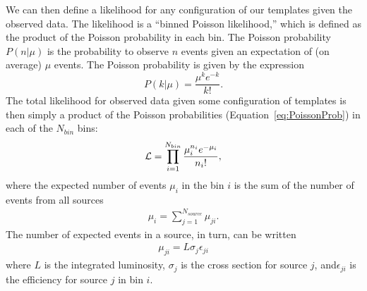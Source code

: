 We can then define a likelihood for any configuration of our templates given the
observed data.  The likelihood is a ``binned Poisson likelihood,'' which is
defined as the product of the Poisson probability in each bin.  The Poisson
probability $P(n|\mu)$ is the probability to observe $n$ events given an
expectation of (on average) $\mu$ events.  The Poisson probability is given by
the expression 
\begin{equation}
  P(k|\mu) = \frac{\mu^k e^{-k}}{k!}.
  \label{eq:PoissonProb}
\end{equation}
The total likelihood for observed data given some configuration of templates is
then simply a product of the Poisson probabilities (Equation~\ref{eq:PoissonProb}) 
in each of the $N_{bin}$ bins: 
\begin{eqnarray}
  {\cal L} = \prod_{i=1}^{N_{bin}} \frac{\mu_i^{n_i} e^{-\mu_i}}{n_i!},
  \label{eq:CoreLikelihood}
\end{eqnarray}
where the expected number of events $\mu_i$ in the bin $i$ is the sum of the number
of events from all sources
\begin{eqnarray}
  \mu_i = \sum_{j=1}^{N_{source}} \mu_{ji}. \nonumber
\end{eqnarray}
The number of expected events in a source, in turn, can be written
\begin{eqnarray}
  \mu_{ji} = L \sigma_j \epsilon_{ji}
  \label{eq:ShapeParameterization}
\end{eqnarray}
where $L$ is the integrated luminosity, $\sigma_j$ is the cross section
for source $j$, and$\epsilon_{ji}$ is the efficiency for source $j$ in bin
$i$.  

